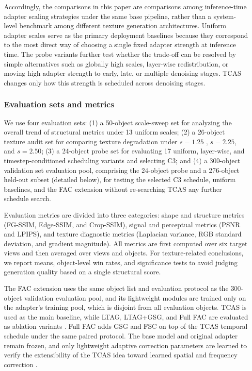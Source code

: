 \documentclass[times,twocolumn,final]{elsarticle}
\providecommand{\DIFadd}[1]{{\protect\color{blue} \sf #1}} %
\providecommand{\DIFdel}[1]{{\protect\color{red} \scriptsize #1}} %
\providecommand{\DIFaddbegin}{} %
\providecommand{\DIFaddend}{} %
\providecommand{\DIFdelbegin}{} %
\providecommand{\DIFdelend}{} %
\newcommand{\DIFscaledelfig}{0.5}
\newlength{\DIFdelgraphicswidth} %
\newlength{\DIFdelgraphicsheight} %
\newcommand{\DIFaddincludegraphics}[2][]{{\color{blue}\fbox{\DIFOincludegraphics[#1]{#2}}}} %
\newcommand{\DIFdelincludegraphics}[2][]{%
\sbox{\DIFdelgraphicsbox}{\DIFOincludegraphics[#1]{#2}}%
\settoboxwidth{\DIFdelgraphicswidth}{\DIFdelgraphicsbox} %
\settoboxtotalheight{\DIFdelgraphicsheight}{\DIFdelgraphicsbox} %
\scalebox{\DIFscaledelfig}{%
\parbox[b]{\DIFdelgraphicswidth}{\usebox{\DIFdelgraphicsbox}\\[-\baselineskip] \rule{\DIFdelgraphicswidth}{0em}}\llap{\resizebox{\DIFdelgraphicswidth}{\DIFdelgraphicsheight}{%
\setlength{\unitlength}{\DIFdelgraphicswidth}%
\begin{picture}(1,1)%
\thicklines\linethickness{2pt} %
{\color[rgb]{1,0,0}\put(0,0){\framebox(1,1){}}}%
{\color[rgb]{1,0,0}\put(0,0){\line( 1,1){1}}}%
{\color[rgb]{1,0,0}\put(0,1){\line(1,-1){1}}}%
\end{picture}%
}\hspace*{3pt}}} %
} %
\DeclareRobustCommand{\DIFaddbegin}{\DIFOaddbegin \let\includegraphics\DIFaddincludegraphics} %
\DeclareRobustCommand{\DIFaddend}{\DIFOaddend \let\includegraphics\DIFOincludegraphics} %
\DeclareRobustCommand{\DIFdelbegin}{\DIFOdelbegin \let\includegraphics\DIFdelincludegraphics} %
\DeclareRobustCommand{\DIFdelend}{\DIFOaddend \let\includegraphics\DIFOincludegraphics} %
\begin{document}
Accordingly, the comparisons in this paper are comparisons among inference-time adapter scaling strategies under the same base pipeline, rather than a system-level benchmark among different texture generation architectures. Uniform adapter scales serve as the primary deployment baselines because they correspond to the most direct way of choosing a single fixed adapter strength at inference time. The probe variants further test whether the trade-off can be resolved by simple alternatives such as globally high scales, layer-wise redistribution, or moving high adapter strength to early, late, or multiple denoising stages. TCAS changes only how this strength is scheduled across denoising stages.

\DIFaddbegin \subsubsection{\DIFadd{Evaluation sets and metrics}}

\DIFaddend We use four evaluation sets: (1) a 50-object scale-sweep set for analyzing the overall trend of structural metrics under 13 uniform scales; (2) a 26-object texture audit set for comparing texture degradation under $s = 1.25$ \DIFdelbegin \DIFdel{, $s = 2.25$, }\DIFdelend and $s = 2.50$; (3) a 24-object probe set for evaluating 17 uniform, layer-wise, and timestep-conditioned scheduling variants and selecting C3; and (4) a 300-object \DIFdelbegin \DIFdel{validation set }\DIFdelend \DIFaddbegin \DIFadd{evaluation pool, comprising the 24-object probe and a 276-object held-out subset (detailed below), }\DIFaddend for testing the selected C3 schedule, uniform baselines, and the FAC extension without \DIFdelbegin \DIFdel{re-searching TCAS}\DIFdelend \DIFaddbegin \DIFadd{any further schedule search}\DIFaddend .

Evaluation metrics are divided into three categories: shape and structure metrics (FG-SSIM, Edge-SSIM, and Crop-SSIM), signal and perceptual metrics (PSNR and LPIPS), and texture diagnostic metrics (Laplacian variance, RGB standard deviation, and gradient magnitude). All metrics are first computed over six target views and then averaged over views and objects. For texture-related conclusions, we report means, object-level win rates, and significance tests to avoid judging generation quality based on a single structural score.

The FAC extension uses the same object list and evaluation protocol as the 300-object \DIFdelbegin \DIFdel{validation}\DIFdelend \DIFaddbegin \DIFadd{evaluation pool, and its lightweight modules are trained only on the adapter's training pool, which is disjoint from all evaluation objects}\DIFaddend . TCAS is used as the main baseline, while LTAG, LTAG+GSG, and Full FAC are evaluated as ablation variants \DIFdelbegin \DIFdel{. Full FAC adds GSG and FSC on top of the TCAS temporal schedule}\DIFdelend \DIFaddbegin \DIFadd{under the same paired protocol}\DIFaddend . The base model and original adapter remain frozen, and only lightweight adaptive correction parameters are learned\DIFdelbegin \DIFdel{to verify the extensibility of the TCAS idea toward learned spatial and frequency correction}\DIFdelend \DIFaddbegin \DIFadd{.
}
\end{document}

